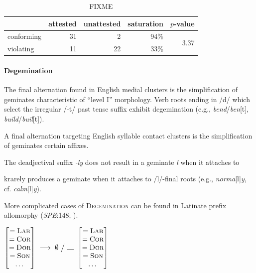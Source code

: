 \begin{table}
\centering
\begin{tabular}{l rrrr}
\toprule
           & attested & unattested & saturation & $p$-value \\
\midrule
conforming & 31       & 2          & 94\%       & \multirow{2}{*}{3.37\e{-07}} \\
violating  & 11       & 22         & 33\%       \\
\bottomrule
\end{tabular}
\caption{FIXME}
\label{npatab}
\end{table}

\paragraph{Degemination}

The final alternation found in English medial clusters is the simplification of geminates characteristic of ``level I'' morphology. Verb roots ending in /d/ which select the irregular /-t/ past tense suffix exhibit degemination (e.g., \emph{bend}/\emph{ben}[t], \emph{build}/\emph{buil}[t]). 

A final alternation targeting English syllable contact clusters is the simplification of geminates certain affixes. 

The deadjectival suffix \emph{-ly} does not result in a geminate \emph{l} when it attaches to 

krarely produces a geminate when it attaches to /l/-final roots (e.g., \emph{norma}[l]\emph{y}, cf. \emph{calm}[l]\emph{y}). 


More complicated cases of \textsc{Degemination} can be found in Latinate prefix allomorphy (\emph{SPE}:148; \citealp[102]{Borowsky1986}).


\begin{example}
$\begin{bmatrix} =\textsc{Lab} \\ =\textsc{Cor} \\ =\textsc{Dor} \\ =\textsc{Son} \\ \ldots{} \end{bmatrix}~\goesto~\emptyset~\big /~\gap~\begin{bmatrix} =\textsc{Lab} \\ =\textsc{Cor} \\ =\textsc{Dor} \\ =\textsc{Son} \\ \ldots{} \end{bmatrix}$
\end{example}

